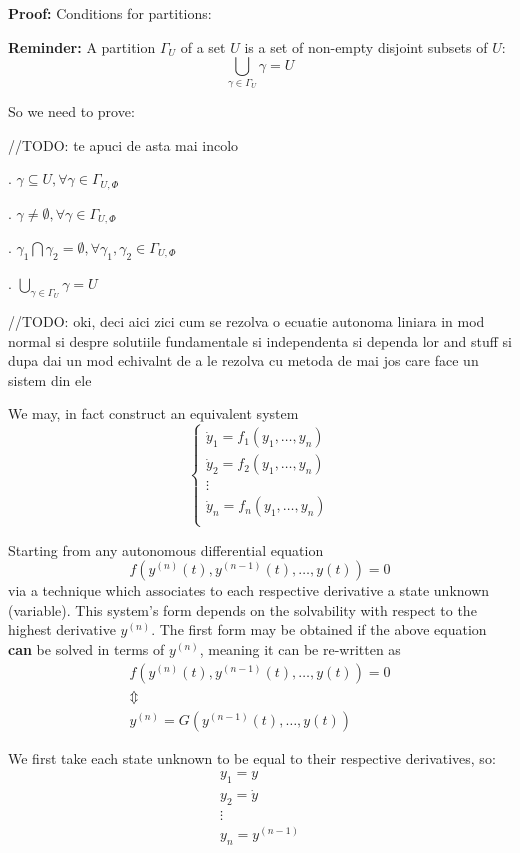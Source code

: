 \textbf{Proof:}
Conditions for partitions:
\par \textbf{Reminder:} A partition $\Gamma_U$ of a set $U$ is a set of non-empty disjoint subsets of $U$:
\[
	\bigcup_{\gamma\in \Gamma_U} \gamma = U
\]

So we need to prove:

\hfill\break
//TODO: te apuci de asta mai incolo \par
\hfill\break

. $\gamma \subseteq U, \forall \gamma \in \Gamma_{U,\Phi}$ \par
{}. $ \gamma \neq \emptyset, \forall \gamma \in \Gamma_{U,\Phi}$ \par
{}. $\gamma_1 \bigcap \gamma_2 = \emptyset, \forall \gamma_1, \gamma_2 \in \Gamma_{U,\Phi}$ \par
{}. $\bigcup_{\gamma\in \Gamma_U} \gamma = U$ \par

\hfill\break
//TODO: oki, deci aici zici cum se rezolva o ecuatie autonoma liniara in mod normal si despre solutiile fundamentale si independenta si dependa lor and stuff si dupa dai un mod echivalnt de a le rezolva cu metoda de mai jos care face un sistem din ele
\hfill\break

We may, in fact construct an equivalent system
\[
	\begin{cases}
		\dot{y}_1 = f_1(y_1,\dots, y_n) \\
		\dot{y}_2 = f_2(y_1,\dots, y_n) \\
		\vdots                          \\
		\dot{y}_n = f_n(y_1,\dots, y_n) \\
	\end{cases}
\]

Starting from any autonomous differential equation
\[
	f(y^{(n)}(t), y^{(n-1)}(t), \dots, y(t))= 0
\]
via a technique which associates to each respective derivative a state unknown (variable).
This system's form depends on the solvability with respect to the highest derivative $y^{(n)}$.
The first form may be obtained if the above equation \textbf{can} be solved in terms of $y^{(n)}$, meaning it can be re-written as
\begin{gather*}
	f(y^{(n)}(t), y^{(n-1)}(t), \dots, y(t))= 0 \\
	\Updownarrow \\
	y^{(n)}  = G(y^{(n-1)}(t), \dots, y(t))
\end{gather*}

We first take each state unknown to be equal to their respective derivatives, so:
\begin{gather*}
	y_1 = y     \\
	y_2 = \dot{y} \\
	\vdots \\
	y_n = y^{(n-1)}
\end{gather*}

